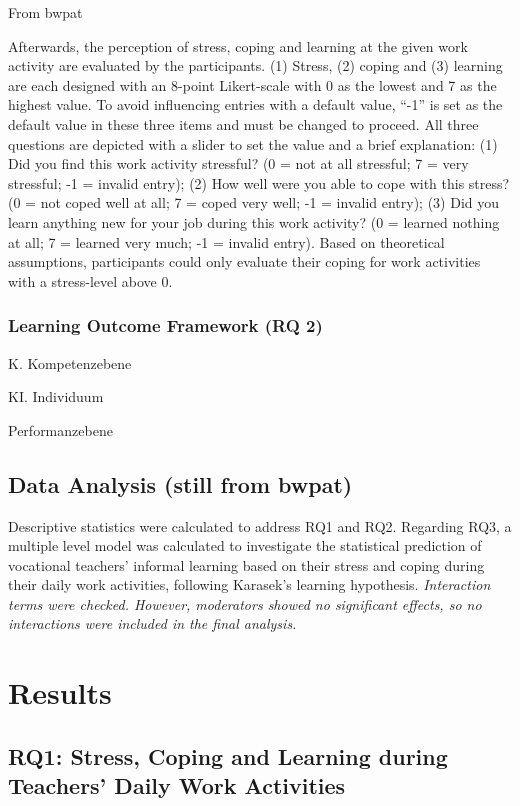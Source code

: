 \documentclass[
]{article}
\begin{document}
From bwpat

Afterwards, the perception of stress, coping and learning at the given
work activity are evaluated by the participants. (1) Stress, (2) coping
and (3) learning are each designed with an 8-point Likert-scale with 0
as the lowest and 7 as the highest value. To avoid influencing entries
with a default value, ``-1'' is set as the default value in these three
items and must be changed to proceed. All three questions are depicted
with a slider to set the value and a brief explanation: (1) Did you find
this work activity stressful? (0 = not at all stressful; 7 = very
stressful; -1 = invalid entry); (2) How well were you able to cope with
this stress? (0 = not coped well at all; 7 = coped very well; -1 =
invalid entry); (3) Did you learn anything new for your job during this
work activity? (0 = learned nothing at all; 7 = learned very much; -1 =
invalid entry). Based on theoretical assumptions, participants could
only evaluate their coping for work activities with a stress-level above
0.

\subsubsection{Learning Outcome Framework (RQ
2)}\label{learning-outcome-framework-rq-2}

K. Kompetenzebene

KI. Individuum

Performanzebene

\subsection{Data Analysis (still from
bwpat)}\label{data-analysis-still-from-bwpat}

Descriptive statistics were calculated to address RQ1 and RQ2. Regarding
RQ3, a multiple level model was calculated to investigate the
statistical prediction of vocational teachers' informal learning based
on their stress and coping during their daily work activities, following
Karasek's learning hypothesis. \emph{Interaction terms were checked.
However, moderators showed no significant effects, so no interactions
were included in the final analysis.}

\section{Results}\label{results}

\subsection{RQ1: Stress, Coping and Learning during Teachers' Daily Work
Activities}\label{rq1-stress-coping-and-learning-during-teachers-daily-work-activities}
\end{document}
